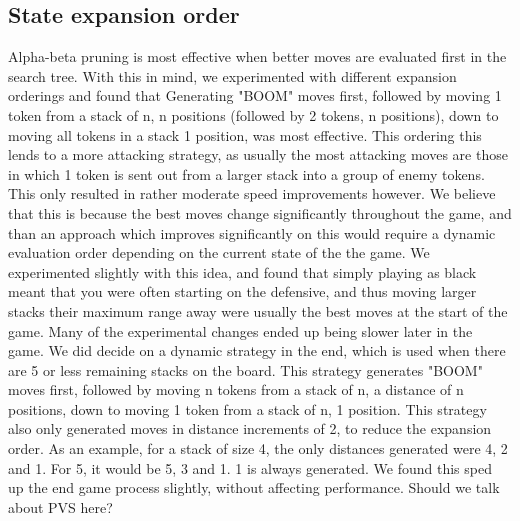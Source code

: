 \documentclass[11pt]{article}
\newcommand{\drafting}[1]{\textcolor{OliveGreen}{#1}}
\begin{document}
\subsection{State expansion order}
Alpha-beta pruning is most effective when better moves are evaluated first in the search tree. With this in mind, we experimented with different expansion orderings and found that \drafting{Generating "BOOM" moves first, followed by moving 1 token from a stack of n, n positions (followed by 2 tokens, n positions), down to moving all tokens in a stack 1 position,} was most effective. \drafting{This ordering this lends to a more attacking strategy, as usually the most attacking moves are those in which 1 token is sent out from a larger stack into a group of enemy tokens. } This only resulted in rather moderate speed improvements however. We believe that this is because the best moves change significantly throughout the game, and than an approach which improves significantly on this would require a dynamic evaluation order depending on the current state of the the game. \drafting{We experimented slightly with this idea, and found that simply playing as black meant that you were often starting on the defensive, and thus moving larger stacks their maximum range away were usually the best moves at the start of the game. Many of the experimental changes ended up being slower later in the game. We did decide on a dynamic strategy in the end, which is used when there are 5 or less remaining stacks on the board. This strategy generates "BOOM" moves first, followed by moving n tokens from a stack of n, a distance of n positions, down to moving 1 token from a stack of n, 1 position. This strategy also only generated moves in distance increments of 2, to reduce the expansion order. As an example, for a stack of size 4, the only distances generated were 4, 2 and 1. For 5, it would be 5, 3 and 1. 1 is always generated. We found this sped up the end game process slightly, without affecting performance. }
Should we talk about PVS here?
\end{document}
